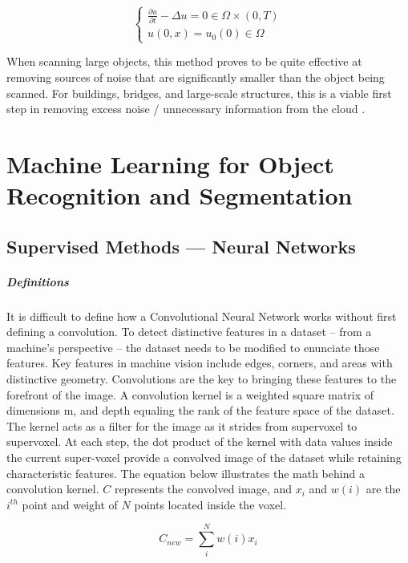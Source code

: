\documentclass[12pt]{drexelthesis}
\let\Oldsection\section
\renewcommand{\section}{\FloatBarrier\Oldsection}
\let\Oldsubsection\subsection
\renewcommand{\subsection}{\FloatBarrier\Oldsubsection}
\begin{document}
\begin{equation}
		\begin{cases}
			\frac{\partial u}{\partial t} - \Delta u = 0 \in \Omega \times (0,T) \\
			u(0,x) = u_{0}(0) \in \Omega
		\end{cases}
\end{equation}

When scanning large objects, this method proves to be quite effective at removing sources of noise that are significantly smaller than the object being scanned. For buildings, bridges, and large-scale structures, this is a viable first step in removing excess noise / unnecessary information from the cloud \cite{RN13}.






 


\section{Machine Learning for Object Recognition and Segmentation}
\label{sec:machinelearning}
\subsection{Supervised Methods --- Neural Networks}
\subparagraph{Definitions}
It is difficult to define how a Convolutional Neural Network works without first defining a convolution. To detect distinctive features in a dataset – from a machine’s perspective – the dataset needs to be modified to enunciate those features. Key features in machine vision include edges, corners, and areas with distinctive geometry. Convolutions are the key to bringing these features to the forefront of the image.
A convolution kernel is a weighted square matrix of dimensions m, and depth equaling the rank of the feature space of the dataset. The kernel acts as a filter for the image as it strides from supervoxel to supervoxel. At each step, the dot product of the kernel with data values inside the current super-voxel provide a convolved image of the dataset while retaining characteristic features. The equation below illustrates the math behind a convolution kernel. $C$ represents the convolved image, and $x_{i}$ and $w(i)$ are the $i^{th}$ point and weight of $N$ points located inside the voxel.

\begin{equation}
	C_{new} = \sum_{i}^{N}  w(i) x_{i}
\end{equation}
\end{document}
